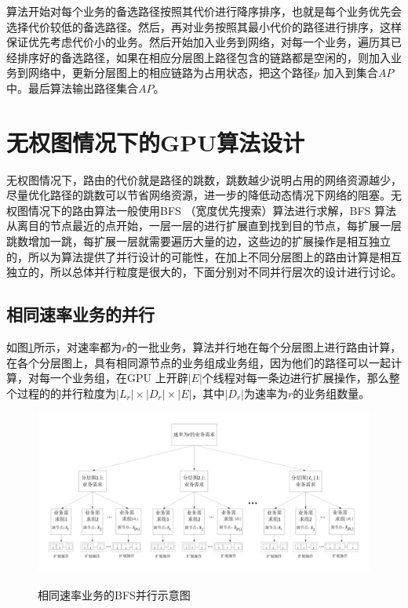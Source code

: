 算法开始对每个业务的备选路径按照其代价进行降序排序，也就是每个业务优先会选择代价较低的备选路径。然后，再对业务按照其最小代价的路径进行排序，这样保证优先考虑代价小的业务。然后开始加入业务到网络，对每一个业务，遍历其已经排序好的备选路径，如果在相应分层图上路径包含的链路都是空闲的，则加入业务到网络中，更新分层图上的相应链路为占用状态，把这个路径$p$ 加入到集合$AP$ 中。最后算法输出路径集合$AP$。
\section{无权图情况下的GPU算法设计}

无权图情况下，路由的代价就是路径的跳数，跳数越少说明占用的网络资源越少，尽量优化路径的跳数可以节省网络资源，进一步的降低动态情况下网络的阻塞。无权图情况下的路由算法一般使用BFS （宽度优先搜索）算法进行求解，BFS 算法从离目的节点最近的点开始，一层一层的进行扩展直到找到目的节点，每扩展一层跳数增加一跳，每扩展一层就需要遍历大量的边，这些边的扩展操作是相互独立的，所以为算法提供了并行设计的可能性，在加上不同分层图上的路由计算是相互独立的，所以总体并行粒度是很大的，下面分别对不同并行层次的设计进行讨论。
\subsection {相同速率业务的并行}

如图\ref{bfs}所示，对速率都为$r$的一批业务，算法并行地在每个分层图上进行路由计算，在各个分层图上，具有相同源节点的业务组成业务组，因为他们的路径可以一起计算，对每一个业务组，在GPU 上开辟$|E|$个线程对每一条边进行扩展操作，那么整个过程的的并行粒度为$|L_r|\times|D_r|\times|E|$，其中$|D_r|$为速率为$r$的业务组数量。
\begin{figure}
\setlength{\belowcaptionskip}{-0.5cm}
\begin{center}
{\includegraphics[width=1 \textwidth]{figures/bfs.pdf}}
\end{center}
\caption{{\footnotesize{相同速率业务的BFS并行示意图}}}
\label{bfs}
\end{figure}
